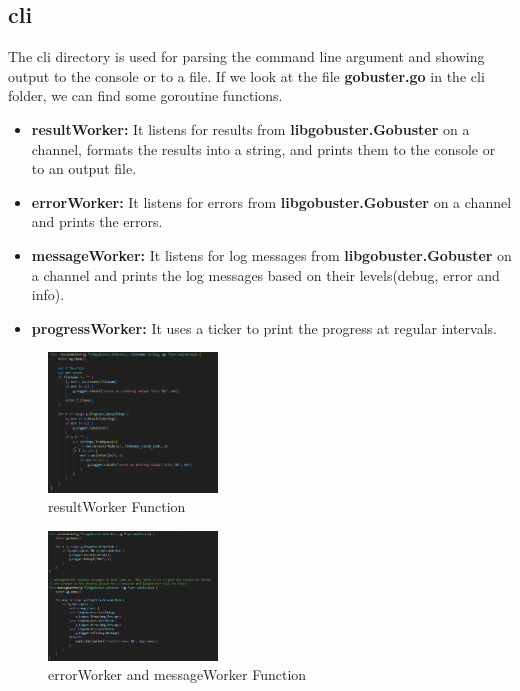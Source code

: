 \documentclass[12 pt]{article}
\begin{document}
\subsection{cli}
The cli directory is used for parsing the command line argument and showing output to the console or to a file. If we look at the file \textbf{gobuster.go} in the cli folder, we can find some goroutine functions.
\begin{itemize}
    \item \textbf{resultWorker:} It listens for results from \textbf{libgobuster.Gobuster} on a channel, formats the results into a string, and prints them to the console or to an output file.
    \item \textbf{errorWorker:} It listens for errors from \textbf{libgobuster.Gobuster} on a channel and prints the errors.
    \item \textbf{messageWorker:} It listens for log messages from \textbf{libgobuster.Gobuster} on a channel and prints the log messages based on their levels(debug, error and info).
    \item \textbf{progressWorker:} It uses a ticker to print the progress at regular intervals.
\end{itemize}  
\begin{figure}[!htbp]
    \centering
    \includegraphics[width=0.4\textwidth]{resultWorker.png}
    \caption{resultWorker Function}
    \label{fig: resultWorker}
\end{figure}
\begin{figure}[!htbp]
    \centering
    \includegraphics[width=0.4\textwidth]{errorWorker_messageWorker.png}
    \caption{errorWorker and messageWorker Function}
    \label{fig: errorWorker and messageWorker}
\end{figure}
\end{document}
